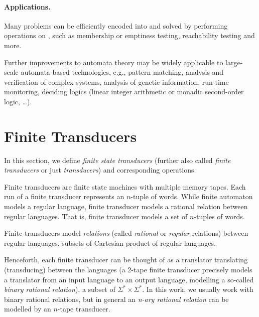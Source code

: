 \paragraph{Applications.}
Many problems can be efficiently encoded into \nfas and solved by performing operations on \nfas, such as membership or emptiness testing, reachability testing and more.


Further improvements to automata theory may be widely applicable to large-scale automata-based technologies, e.g., pattern matching, analysis and verification of complex systems, analysis of genetic information, run-time monitoring, deciding logics (linear integer arithmetic or monadic second-order logic, \ldots).

\section{Finite Transducers}

In this section, we define \emph{finite state transducers} (further also called \emph{finite transducers} or just \emph{transducers}) and corresponding operations.

Finite transducers are finite state machines with multiple memory tapes.
Each run of a finite transducer represents an $n$-tuple of words.
While finite automaton models a regular language, finite transducer models a rational relation between regular languages.
That is, finite transducer models a set of $n$-tuples of words.


Finite transducers model \emph{relations} (called \emph{rational} or \emph{regular} relations) between regular languages, subsets of Cartesian product of regular languages.

Henceforth, each finite transducer can be thought of as a translator translating (transducing) between the languages (a 2-tape finite transducer precisely models a translator from an input language to an output language, modelling a so-called \emph{binary rational relation}), a subset of $\Sigma^* \times \Sigma^*$.
In this work, we usually work with binary rational relations, but in general an \emph{n-ary rational relation} can be modelled by an $n$-tape transducer.


